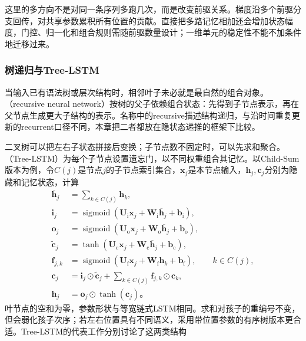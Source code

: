 这里的多方向不是对同一条序列多跑几次，而是改变前驱关系。梯度沿多个前驱分支回传，对共享参数累积所有位置的贡献。直接把多路记忆相加还会增加状态幅度，门控、归一化和组合规则需随前驱数量设计；一维单元的稳定性不能不加条件地迁移过来。

\subsubsection{树递归与Tree-LSTM}
\label{sec:rnn-tree}

当输入已有语法树或层次结构时，相邻叶子未必就是最自然的组合对象。（recursive neural network）按树的父子依赖组合状态：先得到子节点表示，再在父节点生成更大子结构的表示。名称中的recursive描述结构递归，与沿时间重复更新的recurrent口径不同，本章把二者都放在隐状态递推的框架下比较。

二叉树可以把左右子状态拼接后变换；子节点数不固定时，可以先求和聚合。（Tree-LSTM）为每个子节点设置遗忘门，以不同权重组合其记忆。以Child-Sum版本为例，令$C(j)$是节点$j$的子节点索引集合，$\bm{x}_j$是本节点输入，$\bm{h}_j,\bm{c}_j$分别为隐藏和记忆状态，计算
\begin{equation}
  \begin{aligned}
    \overline{\bm{h}}_j&=\sum_{k\in C(j)}\bm{h}_k,\\
    \bm{i}_j&=\operatorname{sigmoid}\!\left(
       \bm{U}_{\mathrm{i}}\bm{x}_j+\bm{W}_{\mathrm{i}}\overline{\bm{h}}_j
       +\bm{b}_{\mathrm{i}}\right),\\
    \bm{o}_j&=\operatorname{sigmoid}\!\left(
       \bm{U}_{\mathrm{o}}\bm{x}_j+\bm{W}_{\mathrm{o}}\overline{\bm{h}}_j
       +\bm{b}_{\mathrm{o}}\right),\\
    \widetilde{\bm{c}}_j&=\tanh\!\left(
       \bm{U}_{\mathrm{c}}\bm{x}_j+\bm{W}_{\mathrm{c}}\overline{\bm{h}}_j
       +\bm{b}_{\mathrm{c}}\right),\\
    \bm{f}_{j,k}&=\operatorname{sigmoid}\!\left(
       \bm{U}_{\mathrm{f}}\bm{x}_j+\bm{W}_{\mathrm{f}}\bm{h}_k
       +\bm{b}_{\mathrm{f}}\right),\qquad k\in C(j),\\
    \bm{c}_j&=\bm{i}_j\odot\widetilde{\bm{c}}_j
        +\sum_{k\in C(j)}\bm{f}_{j,k}\odot\bm{c}_k,\\
    \bm{h}_j&=\bm{o}_j\odot\tanh(\bm{c}_j)\text{。}
  \end{aligned}
  \label{eq:rnn-tree-lstm}
\end{equation}
叶节点的空和为零，参数形状与等宽链式LSTM相同。求和对孩子的重编号不变，但会弱化孩子次序；若左右位置具有不同语义，采用带位置参数的有序树版本更合适。Tree-LSTM的代表工作分别讨论了这两类结构


